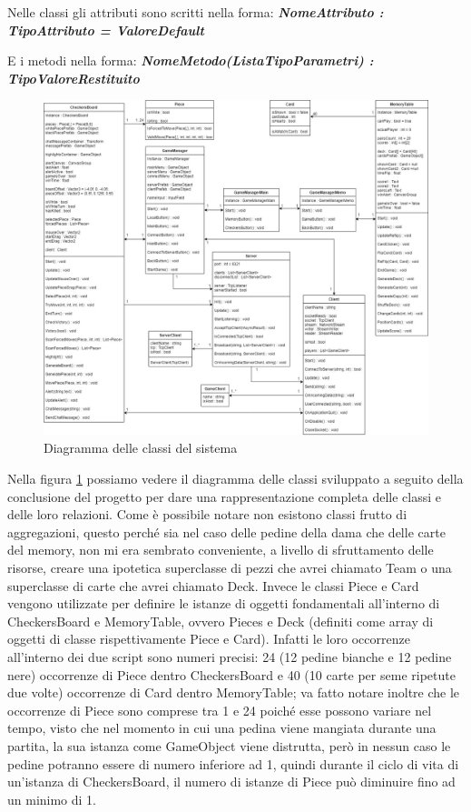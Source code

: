 \documentclass[12pt]{article}
\begin{document}
Nelle classi gli attributi sono scritti nella forma:\newline
\textbf{\textit{NomeAttributo : TipoAttributo = ValoreDefault}}

E i metodi nella forma:\newline
\textbf{\textit{NomeMetodo(ListaTipoParametri) : TipoValoreRestituito}}

\begin{figure}[H]
\centering
\includegraphics[scale=.30]{ClassDiagram}
\caption{Diagramma delle classi del sistema}
\label{img:classdiagram}
\end{figure}

Nella figura \ref{img:classdiagram} possiamo vedere il diagramma delle classi sviluppato a seguito della conclusione del progetto per dare una rappresentazione completa delle classi e delle loro relazioni. Come è possibile notare non esistono classi frutto di aggregazioni, questo perché sia nel caso delle pedine della dama che delle carte del memory, non mi era sembrato conveniente, a livello di sfruttamento delle risorse, creare una ipotetica superclasse di pezzi che avrei chiamato Team o una superclasse di carte che avrei chiamato Deck. Invece le classi Piece e Card vengono utilizzate per definire le istanze di oggetti fondamentali all'interno di CheckersBoard e MemoryTable, ovvero Pieces e Deck (definiti come array di oggetti di classe rispettivamente Piece e Card). Infatti le loro occorrenze all'interno dei due script sono numeri precisi: 24 (12 pedine bianche e 12 pedine nere) occorrenze di Piece dentro CheckersBoard e 40 (10 carte per seme ripetute due volte) occorrenze di Card dentro MemoryTable; va fatto notare inoltre che le occorrenze di Piece sono comprese tra 1 e 24 poiché esse possono variare nel tempo, visto che nel momento in cui una pedina viene mangiata durante una partita, la sua istanza come GameObject viene distrutta, però in nessun caso le pedine potranno essere di numero inferiore ad 1, quindi durante il ciclo di vita di un'istanza di CheckersBoard, il numero di istanze di Piece può diminuire fino ad un minimo di 1.
\end{document}
